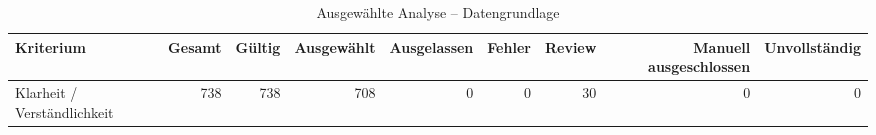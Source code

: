 \begin{table}[htbp]
\centering
\caption{Ausgewählte Analyse -- Datengrundlage}
\begin{tabular}{lrrrrrrrr}
\toprule
Kriterium & Gesamt & Gültig & Ausgewählt & Ausgelassen & Fehler & Review & Manuell ausgeschlossen & Unvollständig \\
\midrule
Klarheit / Verständlichkeit & 738 & 738 & 708 & 0 & 0 & 30 & 0 & 0 \\
\bottomrule
\end{tabular}
\end{table}

